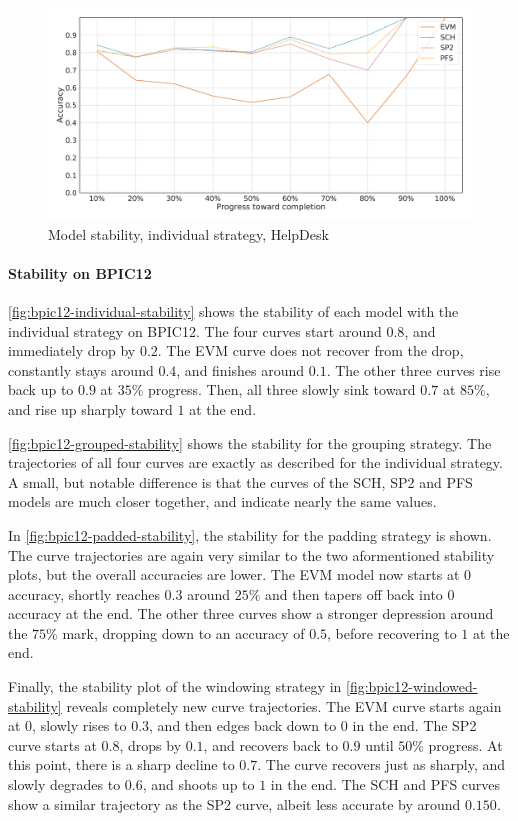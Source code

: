 \begin{figure}[!htb]
    \centering
    \includegraphics[width=\textwidth]{gfx/helpdesk/individual_stability.pdf}
    \caption{Model stability, individual strategy, HelpDesk}
    \label{fig:helpdesk-individual-stability}
\end{figure}

\paragraph{Stability on BPIC12}
\autoref{fig:bpic12-individual-stability} shows the stability of each model with the individual strategy on BPIC12.
The four curves start around $0.8$, and immediately drop by $0.2$.
The EVM curve does not recover from the drop, constantly stays around $0.4$, and finishes around $0.1$.
The other three curves rise back up to $0.9$ at $35\%$ progress.
Then, all three slowly sink toward $0.7$ at $85\%$, and rise up sharply toward $1$ at the end.

\autoref{fig:bpic12-grouped-stability} shows the stability for the grouping strategy.
The trajectories of all four curves are exactly as described for the individual strategy.
A small, but notable difference is that the curves of the SCH, SP2 and PFS models are much closer together, and indicate nearly the same values.

In \autoref{fig:bpic12-padded-stability}, the stability for the padding strategy is shown.
The curve trajectories are again very similar to the two aformentioned stability plots, but the overall accuracies are lower.
The EVM model now starts at $0$ accuracy, shortly reaches $0.3$ around $25\%$ and then tapers off back into $0$ accuracy at the end.
The other three curves show a stronger depression around the $75\%$ mark, dropping down to an accuracy of $0.5$, before recovering to $1$ at the end.

Finally, the stability plot of the windowing strategy in \autoref{fig:bpic12-windowed-stability} reveals completely new curve trajectories.
The EVM curve starts again at $0$, slowly rises to $0.3$, and then edges back down to $0$ in the end.
The SP2 curve starts at $0.8$, drops by $0.1$, and recovers back to $0.9$ until $50\%$ progress.
At this point, there is a sharp decline to $0.7$.
The curve recovers just as sharply, and slowly degrades to $0.6$, and shoots up to $1$ in the end.
The SCH and PFS curves show a similar trajectory as the SP2 curve, albeit less accurate by around $0.150$.

